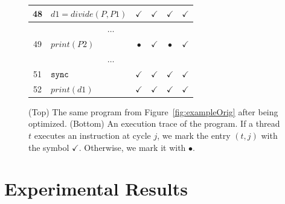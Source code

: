 \documentclass[times,10pt,twocolumn]{article}
\newcommand{\code}[1]{\mbox{\texttt{#1}}}
\begin{document}
\begin{figure}[htb]
\begin{center}
\begin{small}
\begin{tabular}{|c|l|c|c|c|c|}
48      & $ d1 = divide(P, P1)$ & $\checkmark$    & $\checkmark$ & $\checkmark$ & $\checkmark$ \\ \hline
\multicolumn{6}{c}{$\ldots$} \\ \hline
49      & $ print(P2)$ & $\bullet$    & $\checkmark$ & $\bullet$ & $\checkmark$ \\ \hline
\multicolumn{6}{c}{$\ldots$} \\ \hline
51      & $ \code{sync}$        & $\checkmark$ & $\checkmark$ & $\checkmark$ & $\checkmark$ \\ \hline
52      & $ print(d1)$ & $\checkmark$    & $\checkmark$ & $\checkmark$ & $\checkmark$ \\ \hline
\end{tabular}

\end{small}
\end{center}
\caption{(Top) The same program from Figure~\ref{fig:exampleOrig} after being optimized.
(Bottom) An execution trace of the program.
If a thread $t$ executes an instruction at cycle
$j$, we mark the entry $(t, j)$ with the symbol $\checkmark$.
Otherwise, we mark it with $\bullet$.}
\label{fig:exampleOpt}
\end{figure}


\section{Experimental Results}
\label{sec:exp}
\end{document}
